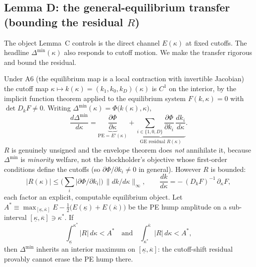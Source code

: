 \subsection*{Lemma D: the general-equilibrium transfer (bounding the residual $R$)}

The object Lemma~C controls is the direct channel $E(\kappa)$ at fixed cutoffs.
The headline $\Delta^{\min}(\kappa)$ also responds to cutoff motion. We make the
transfer rigorous and bound the residual.

\begin{lemma}
\label{lem:LemmaD}
Under A6 (the equilibrium map is a local contraction with invertible Jacobian)
the cutoff map $\kappa\mapsto k(\kappa)=(k_1,k_0,k_D)(\kappa)$ is $C^1$ on the
interior, by the implicit function theorem applied to the equilibrium system
$F(k,\kappa)=0$ with $\det D_kF\neq0$. Writing
$\Delta^{\min}(\kappa)=\Phi\big(k(\kappa),\kappa\big)$,
\begin{equation}
  \frac{d\Delta^{\min}}{d\kappa}
  =\underbrace{\frac{\partial\Phi}{\partial\kappa}}_{\text{PE}=E'(\kappa)}
  +\underbrace{\sum_{i\in\{1,0,D\}}\frac{\partial\Phi}{\partial k_i}\,
       \frac{dk_i}{d\kappa}}_{\text{GE residual }R(\kappa)} .
  \label{eq:totalderiv}
\end{equation}
$R$ is genuinely unsigned and the envelope theorem does \emph{not} annihilate
it, because $\Delta^{\min}$ is \emph{minority} welfare, not the blockholder's
objective whose first-order conditions define the cutoffs (so
$\partial\Phi/\partial k_i\neq0$ in general). However $R$ is bounded:
\begin{equation}
  |R(\kappa)|\le
  \Big(\textstyle\sum_i\big|\partial\Phi/\partial k_i\big|\Big)\,
  \big\|dk/d\kappa\big\|_\infty,\qquad
  \frac{dk}{d\kappa}=-\,(D_kF)^{-1}\,\partial_\kappa F,
  \label{eq:Rbound}
\end{equation}
each factor an explicit, computable equilibrium object. Let
$A^{\ast}\equiv\max_{[\underline\kappa,\overline\kappa]}E
-\tfrac12\big(E(\underline\kappa)+E(\overline\kappa)\big)$ be the PE hump
amplitude on a sub-interval $[\underline\kappa,\overline\kappa]\ni\kappa^\ast$.
If
\begin{equation}
  \int_{\underline\kappa}^{\kappa^{\ast}}|R|\,d\kappa<A^{\ast}
  \quad\text{and}\quad
  \int_{\kappa^{\ast}}^{\overline\kappa}|R|\,d\kappa<A^{\ast},
  \label{eq:transfer-cond}
\end{equation}
then $\Delta^{\min}$ inherits an interior maximum on
$[\underline\kappa,\overline\kappa]$: the cutoff-shift residual provably cannot
erase the PE hump there.
\end{lemma}

